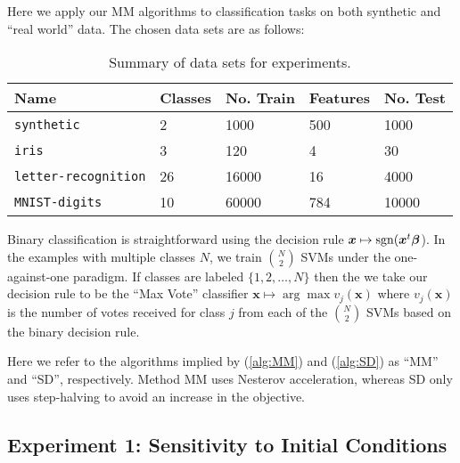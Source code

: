 \documentclass[11pt]{article}
\def\sgn{\mathop{\rm sgn}\nolimits}
\newcommand{\bx}{\boldsymbol{x}}
\newcommand{\bbeta}{\boldsymbol{\beta}}
\begin{document}
Here we apply our MM algorithms to classification tasks on both synthetic and ``real world'' data.
The chosen data sets are as follows:
\begin{table}[!h]
    \centering
    \begin{tabular}{lllll}
        \toprule
        Name & Classes & No. Train & Features & No. Test \\
        \midrule
        \texttt{synthetic} & 2 & 1000 & 500 & 1000 \\
        \texttt{iris} & 3 & 120 & 4 & 30 \\
        \texttt{letter-recognition} & 26 & 16000 & 16 & 4000 \\
        \texttt{MNIST-digits} & 10 & 60000 & 784 & 10000 \\
        \bottomrule
    \end{tabular}
    \caption{Summary of data sets for experiments.}
\end{table}
Binary classification is straightforward using the decision rule $\bx \mapsto \sgn (\bx^t \bbeta$).
In the examples with multiple classes $N$, we train $\binom{N}{2}$ SVMs under the one-against-one paradigm.
If classes are labeled $\{1, 2, \ldots, N\}$ then the we take our decision rule to be the ``Max Vote'' classifier $\bx \mapsto \arg\max v_{j}(\bx)$ where $v_{j}(\bx)$ is the number of votes received for class $j$ from each of the $\binom{N}{2}$ SVMs based on the binary decision rule.

Here we refer to the algorithms implied by (\ref{alg:MM}) and (\ref{alg:SD}) as ``MM'' and ``SD'', respectively.
Method MM uses Nesterov acceleration, whereas SD only uses step-halving to avoid an increase in the objective.

\subsection*{Experiment 1: Sensitivity to Initial Conditions}
\end{document}
